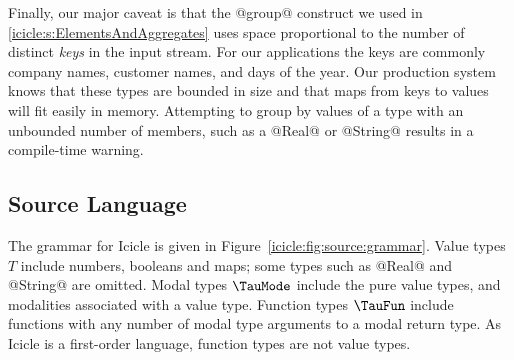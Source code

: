 Finally, our major caveat is that the @group@ construct we used in \autoref{icicle:s:ElementsAndAggregates} uses space proportional to the number of distinct \emph{keys} in the input stream.
For our applications the keys are commonly company names, customer names, and days of the year.
Our production system knows that these types are bounded in size and that maps from keys to values will fit easily in memory.
Attempting to group by values of a type with an unbounded number of members, such as a @Real@ or @String@ results in a compile-time warning.




\subsection{Source Language}
\label{icicle:s:IcicleSource}

The grammar for Icicle is given in Figure~\ref{icicle:fig:source:grammar}.
Value types $T$ include numbers, booleans and maps; some types such as @Real@ and @String@ are omitted.
Modal types $\TauMode$ include the pure value types, and modalities associated with a value type.
Function types $\TauFun$ include functions with any number of modal type arguments to a modal return type.
As Icicle is a first-order language, function types are not value types.


